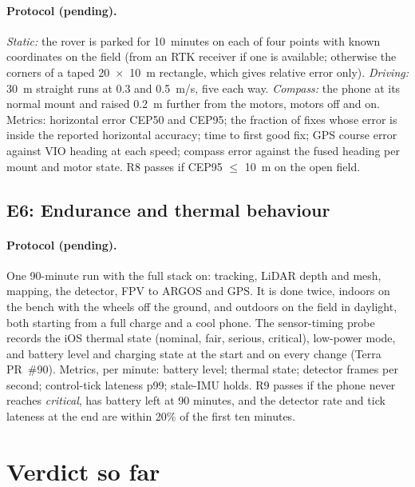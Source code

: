 \paragraph{Protocol (pending).}
\emph{Static:} the rover is parked for 10~minutes on each of four points with known coordinates on the field (from an RTK receiver if one is available; otherwise the corners of a taped 20~$\times$~10~m rectangle, which gives relative error only).
\emph{Driving:} 30~m straight runs at 0.3 and 0.5~m/s, five each way.
\emph{Compass:} the phone at its normal mount and raised 0.2~m further from the motors, motors off and on.
Metrics: horizontal error CEP50 and CEP95; the fraction of fixes whose error is inside the reported horizontal accuracy; time to first good fix; GPS course error against VIO heading at each speed; compass error against the fused heading per mount and motor state.
R8 passes if CEP95 $\le$ 10~m on the open field.

\subsection{E6: Endurance and thermal behaviour}
\label{sec:phone-e6}

\paragraph{Protocol (pending).}
One 90-minute run with the full stack on: tracking, LiDAR depth and mesh, mapping, the detector, FPV to ARGOS and GPS.
It is done twice, indoors on the bench with the wheels off the ground, and outdoors on the field in daylight, both starting from a full charge and a cool phone.
The sensor-timing probe records the iOS thermal state (nominal, fair, serious, critical), low-power mode, and battery level and charging state at the start and on every change (Terra PR~\#90).
Metrics, per minute: battery level; thermal state; detector frames per second; control-tick lateness p99; stale-IMU holds.
R9 passes if the phone never reaches \emph{critical}, has battery left at 90 minutes, and the detector rate and tick lateness at the end are within 20\% of the first ten minutes.

\section{Verdict so far}
\label{sec:phone-verdict}

